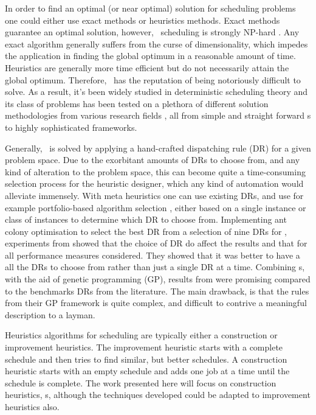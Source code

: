 \documentclass[smallextended]{svjour3}
\begin{document}
In order to find an optimal (or near optimal) solution for scheduling problems 
one could either use exact methods or heuristics methods. Exact methods 
guarantee an optimal solution, however, \jsp\ scheduling is strongly NP-hard 
\cite{Garey76:NPhard}. Any exact algorithm generally suffers from the curse of 
dimensionality, which impedes the application in finding the global optimum in 
a reasonable amount of time. Heuristics are generally more time efficient but 
do not necessarily attain the global optimum. Therefore, \jsp\ has the 
reputation of being notoriously difficult to solve. 
As a result, it's been widely studied in deterministic scheduling theory and 
its class of problems has been tested on a plethora of different solution 
methodologies from various research fields \cite{Meeran12}, all from simple and 
straight forward \dr s to highly sophisticated frameworks.

Generally, \jsp\ is solved by applying a hand-crafted dispatching rule (DR) for 
a given problem space. 
Due to the exorbitant amounts of DRs to choose from, and any kind of alteration 
to the problem space, this can become quite a time-consuming selection process 
for the heuristic designer, which any kind of automation would alleviate 
immensely. 
With meta heuristics one can use existing DRs, and use for example 
portfolio-based algorithm selection \cite{Rice76,Gomes01}, either based on a 
single instance or class of instances \cite{Xu07} to determine which DR to 
choose from. 
Implementing ant colony optimisation to select the best DR 
from a selection of nine DRs for \JSP, experiments from \cite{Korytkowski13} 
showed that the choice of DR do affect the results and that for all performance 
measures considered. They showed that it was better to have a all the DRs to 
choose from rather than just a single DR at a time.
Combining \dr s, with the aid of genetic programming (GP), results from 
\cite{Tay08} were promising compared to the benchmarks DRs from the literature.
The main drawback, is that the rules from their GP framework is quite complex, 
and difficult to contrive a meaningful description to a layman.

Heuristics algorithms for scheduling are typically either a construction or 
improvement heuristics. The improvement heuristic starts with a complete 
schedule and then tries to find similar, but better schedules.  A construction 
heuristic starts with an empty schedule and adds one job at a time until the 
schedule is complete. The work presented here will focus on construction 
heuristics, \dr s, although the techniques developed could be adapted to 
improvement heuristics also. 
\end{document}
